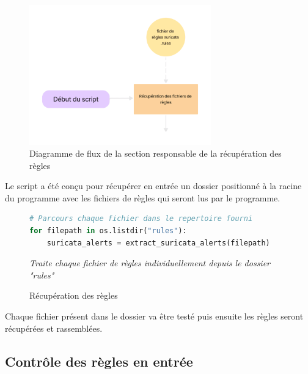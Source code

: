 \begin{figure}[h]%
    \center%
    \includegraphics[width=0.7\textwidth]{assets/diagrameFlux3-1.png}
    \caption[Diagramme de flux de la section responsable de la récupération des règles]{Diagramme de flux de la section responsable de la récupération des règles}\label{fig:diagrameFlux3-1}
\end{figure}

\vspace{1em}

Le script a été conçu pour récupérer en entrée un dossier positionné à la racine du programme avec les fichiers de règles qui seront lus par le programme.\\

\begin{figure}[h]%
    \center%
\begin{lstlisting}[language=Python]
# Parcours chaque fichier dans le repertoire fourni
for filepath in os.listdir("rules"):
    suricata_alerts = extract_suricata_alerts(filepath)
\end{lstlisting}
    {\small
    \textit{Traite chaque fichier de règles individuellement depuis le dossier "rules"}
    }
    \caption[Récupération des règles]{Récupération des règles}
\end{figure}

Chaque fichier présent dans le dossier va être testé puis ensuite les règles seront récupérées et rassemblées.

\newpage

\subsection{Contrôle des règles en entrée}

\vspace{1em}


